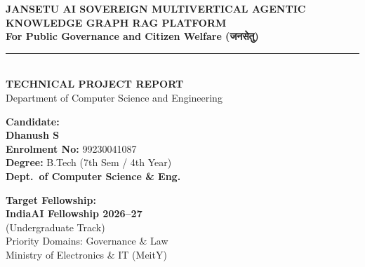 \documentclass[12pt,a4paper,oneside]{report}
\begin{document}
\begin{titlepage}
    \centering
    \vspace*{0.3cm}
    
    {\LARGE \textbf{JANSETU AI SOVEREIGN MULTIVERTICAL AGENTIC KNOWLEDGE GRAPH RAG PLATFORM}}\\[0.4cm]
    {\large \textbf{For Public Governance and Citizen Welfare (जनसेतु)}}\\[0.8cm]
    
    \rule{\linewidth}{1.2pt}\\[0.4cm]
    
    \textbf{\Large TECHNICAL PROJECT REPORT}\\[0.3cm]
    {\normalsize Department of Computer Science and Engineering}\\[1.0cm]
    
    \begin{minipage}{0.48\textwidth}
        \begin{flushleft} \normalsize
            \textbf{Candidate:}\\[0.15cm]
            \textbf{\large Dhanush S}\\[0.1cm]
            \textbf{Enrolment No:} 99230041087\\
            \textbf{Degree:} B.Tech (7th Sem / 4th Year)\\
            \textbf{Dept.\ of Computer Science \& Eng.}
        \end{flushleft}
    \end{minipage}
    \hfill
    \begin{minipage}{0.48\textwidth}
        \begin{flushright} \normalsize
            \textbf{Target Fellowship:}\\[0.15cm]
            \textbf{\large IndiaAI Fellowship 2026--27}\\[0.1cm]
            (Undergraduate Track)\\[0.1cm]
            Priority Domains: Governance \& Law\\
            Ministry of Electronics \& IT (MeitY)
        \end{flushright}
    \end{minipage}
    

\end{titlepage}
\end{document}
